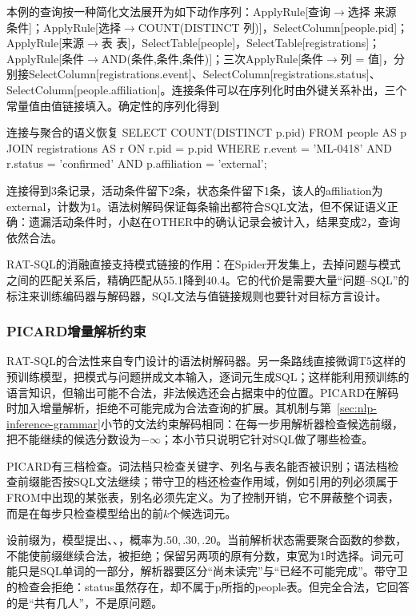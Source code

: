 本例的查询按一种简化文法展开为如下动作序列：ApplyRule[查询$\to$选择 来源 条件]；ApplyRule[选择$\to$COUNT(DISTINCT 列)]，SelectColumn[people.pid]；ApplyRule[来源$\to$表 表]，SelectTable[people]，SelectTable[registrations]；ApplyRule[条件$\to$AND(条件,条件,条件)]；三次ApplyRule[条件$\to$列 = 值]，分别接SelectColumn[registrations.event]、SelectColumn[registrations.status]、SelectColumn[people.affiliation]。连接条件可以在序列化时由外键关系补出，三个常量值由值链接填入。确定性的序列化得到
\begin{codeblock}[language=SQL]{连接与聚合的语义恢复}
SELECT COUNT(DISTINCT p.pid)
FROM people AS p
JOIN registrations AS r ON r.pid = p.pid
WHERE r.event = 'ML-0418'
  AND r.status = 'confirmed'
  AND p.affiliation = 'external';
\end{codeblock}
连接得到3条记录，活动条件留下2条，状态条件留下1条，该人的affiliation为external，计数为1。语法树解码保证每条输出都符合SQL文法，但不保证语义正确：遗漏活动条件时，小赵在OTHER中的确认记录会被计入，结果变成2，查询依然合法。

RAT-SQL的消融直接支持模式链接的作用：在Spider开发集上，去掉问题与模式之间的匹配关系后，精确匹配从55.1降到40.4。它的代价是需要大量“问题--SQL”的标注来训练编码器与解码器，SQL文法与值链接规则也要针对目标方言设计。

\subsubsection{PICARD增量解析约束}
\label{sec:nlp-analysis-picard}

RAT-SQL的合法性来自专门设计的语法树解码器。另一条路线直接微调T5这样的预训练模型，把模式与问题拼成文本输入，逐词元生成SQL；这样能利用预训练的语言知识，但输出可能不合法，非法候选还会占据束中的位置。PICARD在解码时加入增量解析，拒绝不可能完成为合法查询的扩展。其机制与第~\ref{sec:nlp-inference-grammar}小节的文法约束解码相同：在每一步用解析器检查候选前缀，把不能继续的候选分数设为$-\infty$；本小节只说明它针对SQL做了哪些检查。

PICARD有三档检查。词法档只检查关键字、列名与表名能否被识别；语法档检查前缀能否按SQL文法继续；带守卫的档还检查作用域，例如引用的列必须属于FROM中出现的某张表，别名必须先定义。为了控制开销，它不屏蔽整个词表，而是在每步只检查模型给出的前$k$个候选词元。

设前缀为，模型提出、\code{*}、，概率为$.50,.30,.20$。当前解析状态需要聚合函数的参数，不能使前缀继续合法，被拒绝；保留另两项的原有分数，束宽为1时选择\code{*}。词元可能只是SQL单词的一部分，解析器要区分“尚未读完”与“已经不可能完成”。带守卫的检查会拒绝：status虽然存在，却不属于p所指的people表。但完全合法，它回答的是“共有几人”，不是原问题。

